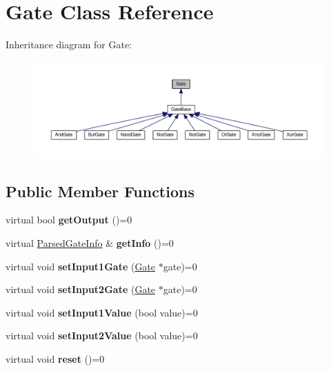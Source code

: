 \hypertarget{classGate}{}\section{Gate Class Reference}
\label{classGate}


Inheritance diagram for Gate\+:
\nopagebreak
\begin{figure}[H]
\begin{center}
\leavevmode
\includegraphics[width=350pt]{classGate__inherit__graph}
\end{center}
\end{figure}
\subsection*{Public Member Functions}
\begin{DoxyCompactItemize}
\item 
virtual bool {\bfseries get\+Output} ()=0\hypertarget{classGate_ac6e023a957af800cd52801cfbba0637d}{}\label{classGate_ac6e023a957af800cd52801cfbba0637d}

\item 
virtual \hyperlink{structParsedGateInfo}{Parsed\+Gate\+Info} \& {\bfseries get\+Info} ()=0\hypertarget{classGate_ac41340ef24e0e3120d48dce4e214a8f7}{}\label{classGate_ac41340ef24e0e3120d48dce4e214a8f7}

\item 
virtual void {\bfseries set\+Input1\+Gate} (\hyperlink{classGate}{Gate} $\ast$gate)=0\hypertarget{classGate_aa72a2b1c924e58600a1081710e0ec50f}{}\label{classGate_aa72a2b1c924e58600a1081710e0ec50f}

\item 
virtual void {\bfseries set\+Input2\+Gate} (\hyperlink{classGate}{Gate} $\ast$gate)=0\hypertarget{classGate_aa45e4603178df835cec2fdd9f9d12ee5}{}\label{classGate_aa45e4603178df835cec2fdd9f9d12ee5}

\item 
virtual void {\bfseries set\+Input1\+Value} (bool value)=0\hypertarget{classGate_a3d358733fa81309b5c301ab84f018f7a}{}\label{classGate_a3d358733fa81309b5c301ab84f018f7a}

\item 
virtual void {\bfseries set\+Input2\+Value} (bool value)=0\hypertarget{classGate_a0b592af9435d0089e0b68d96e49ab4c3}{}\label{classGate_a0b592af9435d0089e0b68d96e49ab4c3}

\item 
virtual void {\bfseries reset} ()=0\hypertarget{classGate_a7c5f4e00801b190c9bf984f3c3ff11c6}{}\label{classGate_a7c5f4e00801b190c9bf984f3c3ff11c6}

\end{DoxyCompactItemize}

